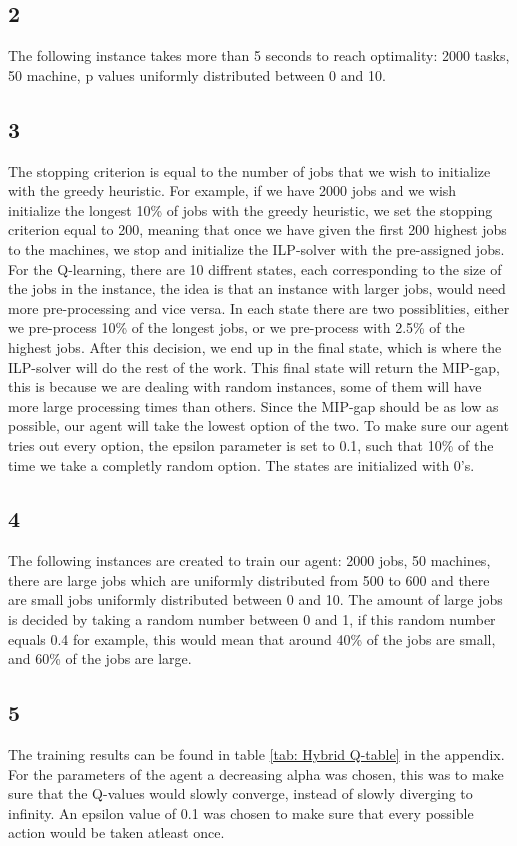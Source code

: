 \documentclass{article}
\begin{document}
\subsection*{2}
The following instance takes more than 5 seconds to reach optimality: 2000 tasks, 50 machine, p values uniformly distributed between 0 and 10. 
\subsection*{3}
The stopping criterion is equal to the number of jobs that we wish to initialize with the greedy heuristic. For example, if we have 2000 jobs and we wish initialize the longest 10\% of jobs with the greedy heuristic, we set the stopping criterion equal to 200, meaning that once we have given the first 200 highest jobs to the machines, we stop and initialize the ILP-solver with the pre-assigned jobs. For the Q-learning, there are 10 diffrent states, each corresponding to the size of the jobs in the instance, the idea is that an instance with larger jobs, would need more pre-processing and vice versa. In each state there are two possiblities, either we pre-process 10\% of the longest jobs, or we pre-process with 2.5\% of the highest jobs. After this decision, we end up in the final state, which is where the ILP-solver will do the rest of the work. This final state will return the MIP-gap, this is because we are dealing with random instances, some of them will have more large processing times than others. Since the MIP-gap should be as low as possible, our agent will take the lowest option of the two. To make sure our agent tries out every option, the epsilon parameter is set to 0.1, such that 10\% of the time we take a completly random option. The states are initialized with 0's.  
\subsection*{4}
The following instances are created to train our agent: 2000 jobs, 50 machines, there are large jobs which are uniformly distributed from 500 to 600 and there are small jobs uniformly distributed between 0 and 10. The amount of large jobs is decided by taking a random number between 0 and 1, if this random number equals 0.4 for example, this would mean that around 40\% of the jobs are small, and 60\% of the jobs are large.  
\subsection*{5}
The training results can be found in table \ref{tab: Hybrid Q-table} in the appendix. For the parameters of the agent a decreasing alpha was chosen, this was to make sure that the Q-values would slowly converge, instead of slowly diverging to infinity. An epsilon value of 0.1 was chosen to make sure that every possible action would be taken atleast once. 
\end{document}

